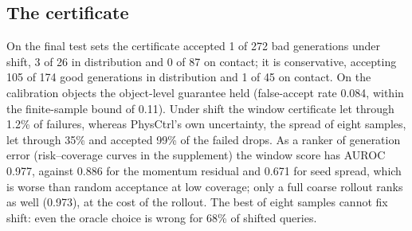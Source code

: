 \subsection{The certificate}
\label{sec:res-cert}
On the final test sets the certificate accepted 1 of 272 bad generations under shift, 3 of 26 in distribution and 0 of 87 on contact; it is conservative, accepting 105 of 174 good generations in distribution and 1 of 45 on contact.
On the calibration objects the object-level guarantee held (false-accept rate 0.084, within the finite-sample bound of 0.11).
Under shift the window certificate let through 1.2\% of failures, whereas PhysCtrl's own uncertainty, the spread of eight samples, let through 35\% and accepted 99\% of the failed drops.
As a ranker of generation error (risk--coverage curves in the supplement) the window score has AUROC 0.977, against 0.886 for the momentum residual and 0.671 for seed spread, which is worse than random acceptance at low coverage; only a full coarse rollout ranks as well (0.973), at the cost of the rollout. The best of eight samples cannot fix shift: even the oracle choice is wrong for 68\% of shifted queries.

